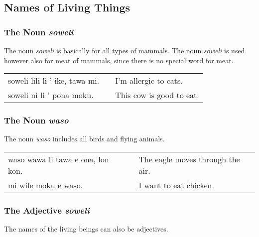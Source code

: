 \subsection*{Names of Living Things}
%
\subsubsection*{The Noun \textit{soweli}}
%
%
The noun \textit{soweli} is basically for all types of mammals.
The noun \textit{soweli} is used however also for meat of mammals, since there is no special word for meat.

\begin{supertabular}{p{5,5cm}|ll}
    soweli lili li ' ike, tawa mi. &  & I'm allergic to cats.    \\
    soweli ni li ' pona moku.      &  & This cow is good to eat. \\
\end{supertabular}

%
\subsubsection*{The Noun \textit{waso}}
%
%
The noun \textit{waso} includes all birds and flying animals.

\begin{supertabular}{p{5,5cm}|ll}
    waso wawa li tawa e ona, lon kon. &  & The eagle moves through the air. \\
    mi wile moku e waso.              &  & I want to eat chicken.           \\
\end{supertabular}

%
\subsubsection*{The Adjective \textit{soweli}}
%
%
The names of the living beings can also be adjectives.

